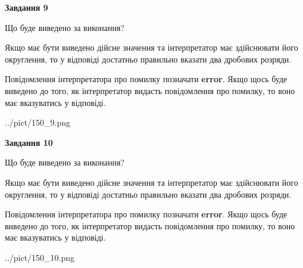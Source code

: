 \documentclass[12pt, ukrainian]{article}
\begin{document}
{\begin {Large}
{\begin {center}\textbf{Завдання 9}\end {center}}\par
Що буде виведено за виконання? \par

Якщо має бути виведено дійсне значення та інтерпретатор має здійснювати його округлення, 
то у відповіді достатньо правильно вказати два дробових розряди.

Повідомлення інтерпретатора про помилку позначати \textbf{error}.
Якщо щось буде виведено до того, як інтерпретатор видасть повідомлення про помилку, 
то воно має вказуватись у відповіді. \par

\begin{center}
	{../pict/150_9.png}
\end{center}
\newpage

{\begin {center}\textbf{Завдання 10}\end {center}}\par
Що буде виведено за виконання? \par

Якщо має бути виведено дійсне значення та інтерпретатор має здійснювати його округлення, 
то у відповіді достатньо правильно вказати два дробових розряди.

Повідомлення інтерпретатора про помилку позначати \textbf{error}.
Якщо щось буде виведено до того, як інтерпретатор видасть повідомлення про помилку, 
то воно має вказуватись у відповіді. \par

\begin{center}
	{../pict/150_10.png}
\end{center}
\newpage

\end {Large}}
\end{document}
